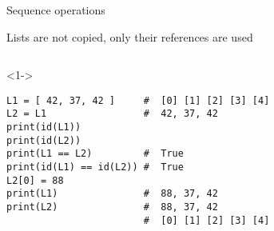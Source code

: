 \begin{frame}[fragile]{Sequence operations}

   Lists are not copied, only their references are used 

   { \footnotesize  {} }

  \begin{center}

  \begin{columns}[onlytextwidth]
    \begin{column}{\textwidth}

      \begin{onlyenv}<1->
        \begin{lstlisting}[style=python,morekeywords={for, in, range, list}]
L1 = [ 42, 37, 42 ]     #  [0] [1] [2] [3] [4]
L2 = L1                 #  42, 37, 42
print(id(L1))
print(id(L2))
print(L1 == L2)         #  True
print(id(L1) == id(L2)) #  True
L2[0] = 88
print(L1)               #  88, 37, 42
print(L2)               #  88, 37, 42
                        #  [0] [1] [2] [3] [4] \end{lstlisting}
      \end{onlyenv}

    \end{column}
  \end{columns}

  \end{center}

\end{frame}



